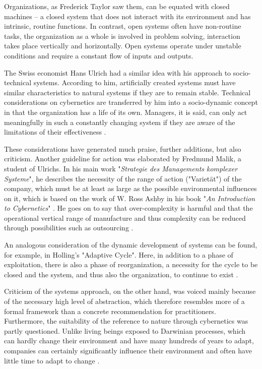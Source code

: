 \documentclass[a4paper,12pt]{article}
\begin{document}
Organizations, as Frederick Taylor saw them, can be equated with closed
machines -- a closed system that does not interact with its environment and has
intrinsic, routine functions. In contrast, open systems often have non-routine
tasks, the organization as a whole is involved in problem solving, interaction
takes place vertically and horizontally. Open systems operate under unstable
conditions and require a constant flow of inputs and outputs.

The Swiss economist Hans Ulrich had a similar idea with his approach to
socio-technical systems. According to him, artificially created systems must
have similar characteristics to natural systems if they are to remain
stable. Technical considerations on cybernetics are transferred by him into a
socio-dynamic concept in that the organization has a life of its own.
Managers, it is said, can only act meaningfully in such a constantly changing
system if they are aware of the limitations of their effectiveness
\cite{oelsnitz:2009}.

These considerations have generated much praise, further additions, but also
criticism. Another guideline for action was elaborated by Fredmund Malik, a
student of Ulrichs. In his main work "\textit{Strategie des Managements
  komplexer Systeme}", he describes the necessity of the range of action
("Varietät") of the company, which must be at least as large as the possible
environmental influences on it, which is based on the work of W. Ross Ashby in
his book "\textit{An Introduction to Cybernetics}" \cite{jackson:1991}. He
goes on to say that over-complexity is harmful and that the operational
vertical range of manufacture and thus complexity can be reduced through
possibilities such as outsourcing \cite{malik:1984}.

An analogous consideration of the dynamic development of systems can be found,
for example, in Holling's "Adaptive Cycle". Here, in addition to a phase of
exploitation, there is also a phase of reorganization, a necessity for the
cycle to be closed and the system, and thus also the organization, to continue
to exist \cite{holling:2001}.

Criticism of the systems approach, on the other hand, was voiced mainly
because of the necessary high level of abstraction, which therefore resembles
more of a formal framework than a concrete recommendation for practitioners.
Furthermore, the suitability of the reference to nature through cybernetics
was partly questioned. Unlike living beings exposed to Darwinian processes,
which can hardly change their environment and have many hundreds of years to
adapt, companies can certainly significantly influence their environment and
often have little time to adapt to change \cite{oelsnitz:2009}.
\end{document}
